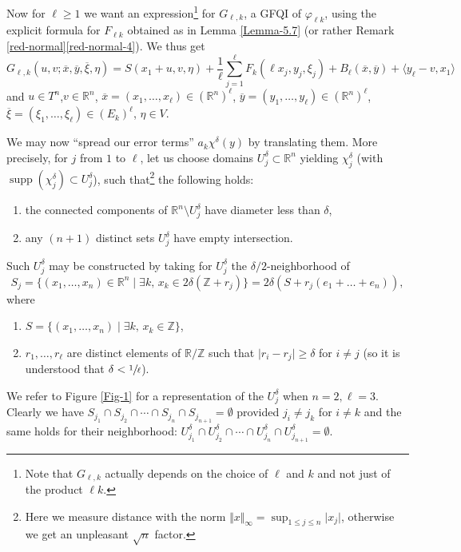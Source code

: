\documentclass[JEP,XML,SOM,NoFloatCountersInSection,Unicode,published]{cedram}
\newenvironment{enumeratea}
{\bgroup\def\theenumi{\alph{enumi}}\begin{enumerate}}
{\end{enumerate}\egroup}
\numberwithin{equation}{section}
\DeclareMathOperator{\supp}{supp}
\newcommand{\GFQI}{\textup{GFQI}\xspace}
\theoremstyle{plain}
\theoremstyle{definition}
\theoremstyle{remark}
\begin{document}
Now for $\ell \geq 1$ we want an expression\footnote{Note that $G_{\ell, k}$ actually depends on the choice of $\ell$ and $k$ and not just of the product $\ell k$.} for $G_{\ell,k}$, a \GFQI of $\varphi_{\ell k}$, using
the explicit formula for ${F}_{\ell k}$ obtained as in Lemma \ref{Lemma-5.7} (or rather Remark \ref{red-normal}\eqref{red-normal-4}). We thus get
\[
G_{\ell,k} (u,v; \overline x, \overline y, \overline\xi, \eta) =
{ S}(x_{1}+u,v, \eta) +
\frac{1}{\ell} \sum_{j=1}^{\ell} {F}_{k} (\ell x_{j}, y_{j},
\xi_{j}) + B_{\ell} (\overline x,\overline y)
+ \langle y_{\ell}-v, x_{1} \rangle
\]
and $u\in T^{n}$,$ v \in {\mathbb R}^{n}$, $\overline x = (x_{1},\dots, x_{\ell})\in ({\mathbb R}^{n})^{\ell}$, $\overline y = (y_{1},\dots,y_{\ell})\in ({\mathbb R}^{n})^{\ell}$, $\overline \xi = (\xi_{1},\dots, \xi_{\ell})\in (E_k)^{\ell}$, $\eta \in V$.

We may now ``spread our error terms'' $a_k\chi^{\delta}(y)$ by translating them. More precisely, for $j$ from $1$ to $\ell$, let us choose domains $U_{j}^{\delta} \subset {\mathbb R}^n$ yielding $\chi_{j}^\delta$ (with $\supp (\chi_{j}^{\delta})\subset U_{j}^{\delta}$), such that\footnote{Here we measure distance with the norm $\Vert x \Vert_\infty=\sup_{1\leq j \leq n} \vert x_j\vert$, otherwise we get an unpleasant $\sqrt n$ factor.} the following holds:
\begin{enumerate} \label{grid}
\item the connected components of ${\mathbb R}^n \setminus U_{j}^{\delta}$ have diameter less than $\delta$,
\item any $(n+1)$ distinct sets $U_{j}^{\delta}$ have empty intersection.
\end{enumerate}
Such $U_{j}^{\delta}$ may be constructed by taking for $U_{j}^{\delta}$ the $\delta/2$-neighborhood of
\[
S_{j}=\{(x_{1},\dots, x_{n}) \in {\mathbb R}^{n}\mid \exists k,\,x_{k}\in 2\delta({\mathbb Z}+r_{j}) \}=2\delta (S + r_j(e_1+\ldots +e_n)),
\]
where
\begin{enumeratea}
\item $S=\{ (x_1,\dots,x_n) \mid \exists k, \,x_k \in {\mathbb Z} \}$,
\item $r_{1},\dots, r_{\ell}$ are distinct elements of $ {\mathbb R} / {\mathbb Z} $ such that $ \vert r_i-r_j \vert \geq \delta$ for $i\neq j$ (so it is understood that $\delta < \sfrac{1}{\ell}$).
\end{enumeratea}
We refer to Figure \ref{Fig-1} for a representation of the $U_j^\delta$ when $n=2, \ell =3$.
Clearly we have $S_{j_1}\cap S_{j_2}\cap\cdots \cap S_{j_n}\cap S_{j_{n+1}}=\emptyset$ provided $j_i\neq j_k$ for $i\neq k$ and the same holds for their
neighborhood: $U_{j_1}^{\delta}\cap U_{j_2}^{\delta}\cap\cdots\cap U_{j_n}^{\delta}\cap U_{j_{n+1}}^{\delta}=\emptyset$.
\end{document}
